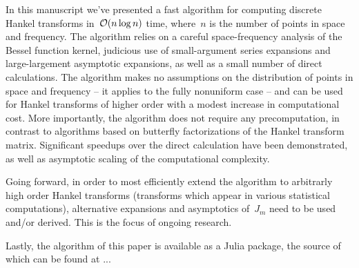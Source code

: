 
In this manuscript we've presented a fast algorithm for computing discrete
Hankel transforms in~$\mathcal{O}(n \log n)$ time, where~$n$ is the number of points in
space and frequency. The algorithm relies on a careful space-frequency analysis
of the Bessel function kernel, judicious use of small-argument series expansions
and large-largement asymptotic expansions, as well as a small number of direct
calculations. The algorithm makes no assumptions on the distribution of points
in space and frequency -- it applies to the fully nonuniform case -- and can be
used for Hankel transforms of higher order with a modest increase in
computational cost. More importantly, the algorithm does not require any
precomputation, in contrast to algorithms based on butterfly factorizations of
the Hankel transform matrix. Significant speedups over the direct calculation
have been demonstrated, as well as asymptotic scaling of the computational
complexity.

Going forward, in order to most efficiently extend the algorithm to arbitrarly
high order Hankel transforms (transforms which appear in various statistical
computations), alternative expansions and asymptotics of~$J_m$ need to be used
and/or derived. This is the focus of ongoing research.

Lastly, the algorithm of this paper is available {\color{red} as a Julia
  package, the source of which can be found at ... }



